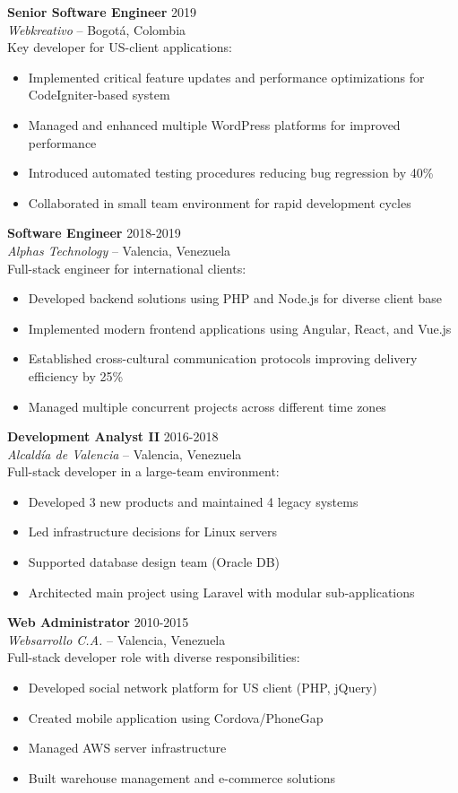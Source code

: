 \documentclass[11pt,a4paper]{article}
\begin{document}
\noindent\textbf{Senior Software Engineer} \hfill 2019\\
\textit{Webkreativo} -- Bogotá, Colombia\\
Key developer for US-client applications:
\begin{itemize}[noitemsep]
  \item Implemented critical feature updates and performance optimizations for CodeIgniter-based system
  \item Managed and enhanced multiple WordPress platforms for improved performance
  \item Introduced automated testing procedures reducing bug regression by 40\%
  \item Collaborated in small team environment for rapid development cycles
\end{itemize}

\noindent\textbf{Software Engineer} \hfill 2018-2019\\
\textit{Alphas Technology} -- Valencia, Venezuela\\
Full-stack engineer for international clients:
\begin{itemize}[noitemsep]
  \item Developed backend solutions using PHP and Node.js for diverse client base
  \item Implemented modern frontend applications using Angular, React, and Vue.js
  \item Established cross-cultural communication protocols improving delivery efficiency by 25\%
  \item Managed multiple concurrent projects across different time zones
\end{itemize}

\noindent\textbf{Development Analyst II} \hfill 2016-2018\\
\textit{Alcaldía de Valencia} -- Valencia, Venezuela\\
Full-stack developer in a large-team environment:
\begin{itemize}[noitemsep]
  \item Developed 3 new products and maintained 4 legacy systems
  \item Led infrastructure decisions for Linux servers
  \item Supported database design team (Oracle DB)
  \item Architected main project using Laravel with modular sub-applications
\end{itemize}

\noindent\textbf{Web Administrator} \hfill 2010-2015\\
\textit{Websarrollo C.A.} -- Valencia, Venezuela\\
Full-stack developer role with diverse responsibilities:
\begin{itemize}[noitemsep]
  \item Developed social network platform for US client (PHP, jQuery)
  \item Created mobile application using Cordova/PhoneGap
  \item Managed AWS server infrastructure
  \item Built warehouse management and e-commerce solutions
\end{itemize}
\end{document}
